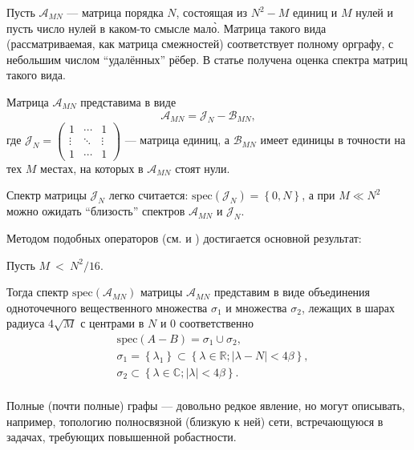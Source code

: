Пусть \( \mathscr{A}_{MN} \) --- матрица порядка \( N \),
состоящая из \( N^2 - M \) единиц и \( M \) нулей
и пусть число нулей в каком-то смысле мал\`о.
Матрица такого вида (рассматриваемая, как матрица смежностей) соответствует
полному орграфу, с небольшим числом ``удалённых'' рёбер.
В статье получена оценка спектра
матриц такого вида.

Матрица \( \mathscr{A}_{MN} \) представима в виде
\[
    \mathscr{A}_{MN} = \mathscr{J}_{N} - \mathscr{B}_{MN},
    \]
где \(
\mathscr{J}_{N} =
\begin{pmatrix}1 & \cdots & 1 \\
\vdots & \ddots & \vdots \\
1 & \cdots & 1
\end{pmatrix} \) --- матрица единиц,
а \( \mathscr{B}_{MN} \) имеет единицы в точности на тех \( M \)
местах, на которых в \( \mathscr{A}_{MN} \) стоят нули.

Спектр матрицы \( \mathscr{J}_{N} \) легко считается:
\( \mathrm{spec}\left({\mathscr{J}_{N}}\right) = \left\{0, N \right\} \),
а при \( M \ll N^2 \) можно ожидать ``близость'' спектров
\( \mathscr{A}_{MN} \) и \( \mathscr{J}_{N} \).

Методом подобных операторов (см. \cite{baskakov-harmonic} и \cite{baskakov-split})
достигается основной результат:
\begin{thm}\label{thm:almostallones-spectra}
    Пусть
    \(M~<~\displaystyle{N^2/16}. \)

    Тогда спектр \( \mathrm{spec}\left({\mathscr{A}_{MN}}\right) \)
    матрицы \( \mathscr{A}_{MN} \)
    представим в виде объединения
    одноточечного вещественного множества \( \sigma_1 \)
    и множества \( \sigma_2 \),
    лежащих в шарах радиуса \( 4\sqrt{M} \)
    с центрами в \( N \) и \( 0 \) соответственно
    \begin{equation}\begin{aligned}
        & \mathrm{spec}\left({A-B}\right) = \sigma_1 \cup \sigma_2, \\
        & \sigma_1 = \left\{ \lambda_1 \right\}
          \subset \left\{ \lambda\in\mathbb{R}; \lvert \lambda - N\rvert < 4\beta \right\}, \\
        & \sigma_2 \subset \left\{\lambda\in\mathbb{C}; \lvert\lambda\rvert <4\beta \right\}. \\
    \end{aligned}\end{equation}
\end{thm}

Полные (почти полные) графы --- довольно редкое явление,
но могут описывать, например, топологию полносвязной (близкую к ней) сети,
встречающуюся в задачах, требующих повышенной робастности.

